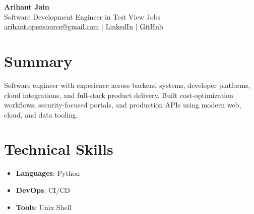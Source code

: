 \documentclass[11pt,a4paper]{article}
\begin{document}
\begin{center}
{\LARGE \textbf{Arihant Jain}}
\\ Software Development Engineer in Test  View Jobs
\\ \href{mailto:arihant.opensource@gmail.com}{arihant.opensource@gmail.com} $\mid$ \href{https://linkedin.com/in/arihantjain1208}{LinkedIn} $\mid$ \href{https://github.com/Arihant1208}{GitHub}
\end{center}

\section{Summary}
Software engineer with experience across backend systems, developer platforms, cloud integrations, and full-stack product delivery. Built cost-optimization workflows, security-focused portals, and production APIs using modern web, cloud, and data tooling.

\section{Technical Skills}
\begin{itemize}
  \item \textbf{Languages}: Python
  \item \textbf{DevOps}: CI/CD
  \item \textbf{Tools}: Unix Shell
\end{itemize}
\end{document}
